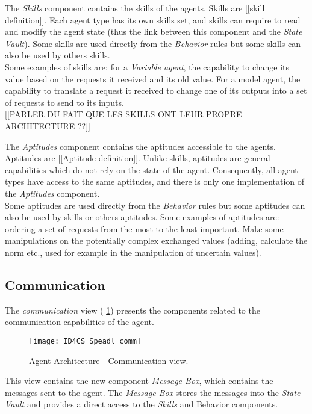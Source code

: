 The \emph{Skills} component contains the skills of the agents. Skills are [[skill definition]]. Each agent type has its own skills set, and skills can require to read and modify the agent state (thus the link between this component and the \emph{State Vault}). Some skills are used directly from the \emph{Behavior} rules but some skills can also be used by others skills.\\
Some examples of skills are: for a \emph{Variable agent}, the capability to change its value based on the requests it received and its old value. For a model agent, the capability to translate a request it received to change one of its outputs into a set of requests to send to its inputs.\\

[[PARLER DU FAIT QUE LES SKILLS ONT LEUR PROPRE ARCHITECTURE ??]]

The \emph{Aptitudes} component contains the aptitudes accessible to the agents. Aptitudes are [[Aptitude definition]]. Unlike skills, aptitudes are general capabilities which do not rely on the state of the agent. Consequently, all agent types have access to the same aptitudes, and there is only one implementation of the \emph{Aptitudes} component.\\
Some aptitudes are used directly from the \emph{Behavior} rules but some aptitudes can also be used by skills or others aptitudes.
Some examples of aptitudes are: ordering a set of requests from the most to the least important. Make some manipulations on the potentially complex exchanged values (adding, calculate the norm etc., used for example in the manipulation of uncertain values).

\subsection{Communication}

The \emph{communication} view (\figurename{} \ref{Arch-comm}) presents the components related to the communication capabilities of the agent. 

\begin{figure}
\centering
\texttt{[image: ID4CS\_Speadl\_comm]}
\caption{Agent Architecture - Communication view.}
\label{Arch-comm}
\end{figure}

This view contains the new component \emph{Message Box}, which contains the messages sent to the agent. The \emph{Message Box} stores the messages into the \emph{State Vault} and provides a direct access to the \emph{Skills} and {Behavior} components.

